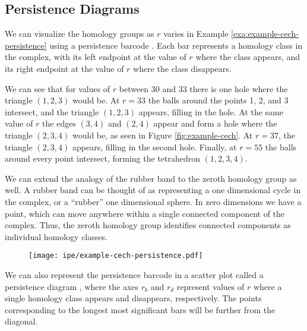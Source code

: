 \subsection{Persistence Diagrams}

We can visualize the homology groups as \(r\) varies in Example \ref{exa:example-cech-persistence} using a persistence barcode .
Each bar represents a homology class in the complex, with its left endpoint at the value of \(r\) where the class appears, and its right endpoint at the value of \(r\) where the class disappears.

We can see that for values of \(r\) between 30 and 33 there is one hole where the triangle \((1,2,3)\) would be.
At \(r=33\) the balls around the points 1, 2, and 3 intersect, and the triangle \((1,2,3)\) appears, filling in the hole.
At the same value of \(r\) the edges \((3,4)\) and \((2,4)\) appear and form a hole where the triangle \((2,3,4)\) would be, as seen in Figure \ref{fig:example-cech}.
At \(r=37\), the triangle \((2,3,4)\) appears, filling in the second hole.
Finally, at \(r=55\) the balls around every point intersect, forming the tetrahedron \((1,2,3,4)\).

We can extend the analogy of the rubber band to the zeroth homology group as well.
A rubber band can be thought of as representing a one dimensional cycle in the complex, or a ``rubber'' one dimensional sphere.
In zero dimensions we have a point, which can move anywhere within a single connected component of the complex.
Thus, the zeroth homology group identifies connected components as individual homology classes.

\begin{figure}
    \centering
    \texttt{[image: ipe/example-cech-persistence.pdf]}
    \caption{}
    \label{fig:example-cech-persistence}
\end{figure}

We can also represent the persistence barcode in a scatter plot called a persistence diagram , where the axes \(r_b\) and \(r_d\) represent values of \(r\) where a single homology class appears and disappears, respectively.
The points corresponding to the longest most significant bars will be further from the diagonal.

